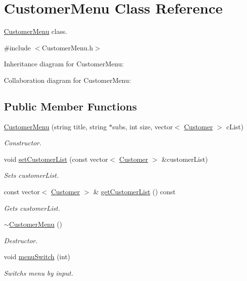 \hypertarget{classCustomerMenu}{}\section{Customer\+Menu Class Reference}
\label{classCustomerMenu}


\hyperlink{classCustomerMenu}{Customer\+Menu} class.  




{\ttfamily \#include $<$Customer\+Menu.\+h$>$}



Inheritance diagram for Customer\+Menu\+:


Collaboration diagram for Customer\+Menu\+:
\subsection*{Public Member Functions}
\begin{DoxyCompactItemize}
\item 
\hyperlink{classCustomerMenu_a05bf66ccf5ce81d26cc4e39fbc2dbb64}{Customer\+Menu} (string title, string $\ast$subs, int size, vector$<$ \hyperlink{classCustomer}{Customer} $>$ c\+List)\hypertarget{classCustomerMenu_a05bf66ccf5ce81d26cc4e39fbc2dbb64}{}\label{classCustomerMenu_a05bf66ccf5ce81d26cc4e39fbc2dbb64}

\begin{DoxyCompactList}\small\item\em Constructor. \end{DoxyCompactList}\item 
void \hyperlink{classCustomerMenu_abd785329cc569b15848388dd9e193613}{set\+Customer\+List} (const vector$<$ \hyperlink{classCustomer}{Customer} $>$ \&customer\+List)
\begin{DoxyCompactList}\small\item\em Sets customer\+List. \end{DoxyCompactList}\item 
const vector$<$ \hyperlink{classCustomer}{Customer} $>$ \& \hyperlink{classCustomerMenu_a76d1f3b2b06c19ed15505c57c58564b4}{get\+Customer\+List} () const 
\begin{DoxyCompactList}\small\item\em Gets customer\+List. \end{DoxyCompactList}\item 
\hyperlink{classCustomerMenu_aa28a689d645c7df53e2d714195fcf08e}{$\sim$\+Customer\+Menu} ()
\begin{DoxyCompactList}\small\item\em Destructor. \end{DoxyCompactList}\item 
void \hyperlink{classCustomerMenu_a9c43057a2fdd5fa1323e4cc1ec54f4be}{menu\+Switch} (int)
\begin{DoxyCompactList}\small\item\em Switchs menu by input. \end{DoxyCompactList}\end{DoxyCompactItemize}
